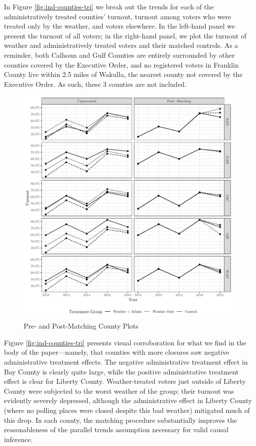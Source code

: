 \documentclass[
  12pt,
]{article}
\begin{document}
In Figure \ref{fig:ind-counties-tri} we break out the trends for each of the administratively treated counties' turnout, turnout among voters who were treated only by the weather, and voters elsewhere. In the left-hand panel we present the turnout of all voters; in the right-hand panel, we plot the turnout of weather and administratively treated voters and their matched controls. As a reminder, both Calhoun and Gulf Counties are entirely surrounded by other counties covered by the Executive Order, and no registered voters in Franklin County live within 2.5 miles of Wakulla, the nearest county not covered by the Executive Order. As such, these 3 counties are not included.

\begin{figure}[H]

{\centering \includegraphics{si_files/figure-latex/indcs-chunk-tr-1} 

}

\caption{\label{fig:ind-counties-tri}Pre- and Post-Matching County Plots}\label{fig:indcs-chunk-tr}
\end{figure}

Figure \ref{fig:ind-counties-tri} presents visual corroboration for what we find in the body of the paper---namely, that counties with more closures saw negative administrative treatment effects. The negative administrative treatment effect in Bay County is clearly quite large, while the positive administrative treatment effect is clear for Liberty County. Weather-treated voters just outside of Liberty County were subjected to the worst weather of the group; their turnout was evidently severely depressed, although the administrative effect in Liberty County (where no polling places were closed despite this bad weather) mitigated much of this drop. In each county, the matching procedure substantially improves the reasonableness of the parallel trends assumption necessary for valid causal inference.
\end{document}

